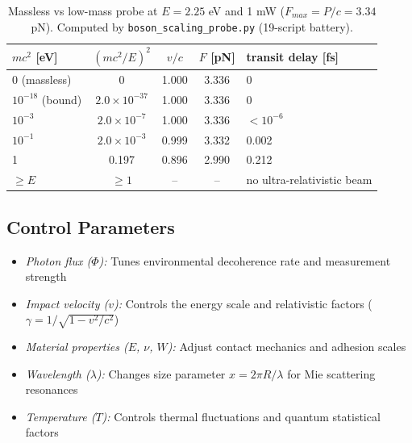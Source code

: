 \documentclass[12pt,twoside]{article}
\begin{document}
\begin{table}[h!]
\centering
\caption{Massless vs low-mass probe at $E=2.25$ eV and 1 mW ($F_{max}=P/c=3.34$ pN). Computed by \texttt{boson\_scaling\_probe.py} (19-script battery).}
\label{tab:probetype}
\begin{tabular}{lcccl}
\toprule
$mc^2$ [eV] & $(mc^2/E)^2$ & $v/c$ & $F$ [pN] & transit delay [fs] \\
\midrule
0 (massless)      & 0                  & 1.000 & 3.336 & 0 \\
$10^{-18}$ (bound) & $2.0\times10^{-37}$ & 1.000 & 3.336 & 0 \\
$10^{-3}$         & $2.0\times10^{-7}$  & 1.000 & 3.336 & $<10^{-6}$ \\
$10^{-1}$         & $2.0\times10^{-3}$  & 0.999 & 3.332 & 0.002 \\
1                 & 0.197               & 0.896 & 2.990 & 0.212 \\
$\geq E$          & $\geq 1$            & --    & --     & no ultra-relativistic beam \\
\bottomrule
\end{tabular}
\end{table}

\subsection{Control Parameters}\label{sec:control}
\begin{itemize}
\item \textit{Photon flux ($\Phi$):} Tunes environmental decoherence rate and measurement strength
\item \textit{Impact velocity ($v$):} Controls the energy scale and relativistic factors ($\gamma = 1/\sqrt{1-v^2/c^2}$)
\item \textit{Material properties ($E$, $\nu$, $W$):} Adjust contact mechanics and adhesion scales
\item \textit{Wavelength ($\lambda$):} Changes size parameter $x = 2\pi R/\lambda$ for Mie scattering resonances
\item \textit{Temperature ($T$):} Controls thermal fluctuations and quantum statistical factors
\end{itemize}
\end{document}
